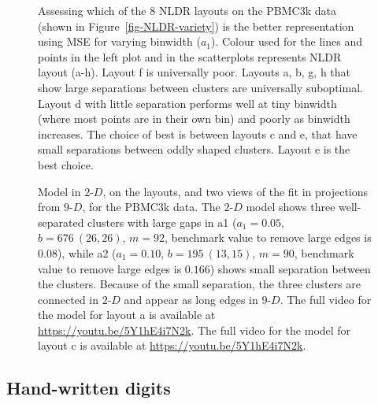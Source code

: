 \documentclass[
  12pt]{article}
\newcommand\gD{$2\text{-}D$}
\begin{document}
\begin{figure}[H]


\caption{\label{fig-pbmc-mse}Assessing which of the 8 NLDR layouts on
the PBMC3k data (shown in Figure~\ref{fig-NLDR-variety}) is the better
representation using MSE for varying binwidth (\(a_1\)). Colour used for
the lines and points in the left plot and in the scatterplots represents
NLDR layout (a-h). Layout f is universally poor. Layouts a, b, g, h that
show large separations between clusters are universally suboptimal.
Layout d with little separation performs well at tiny binwidth (where
most points are in their own bin) and poorly as binwidth increases. The
choice of best is between layouts c and e, that have small separations
between oddly shaped clusters. Layout e is the best choice.}

\end{figure}%

\begin{figure}[H]


\caption{\label{fig-model-pbmc-author-proj}Model in \gD{}, on the
layouts, and two views of the fit in projections from \(9\text{-}D\),
for the PBMC3k data. The \gD{} model shows three well-separated clusters
with large gaps in a1 (\(a_1 = 0.05\), \(b = 676 \  (26,  26)\),
\(m = 92\), benchmark value to remove large edges is \(0.08\)), while a2
(\(a_1 = 0.10\), \(b = 195 \  (13,  15)\), \(m = 90\), benchmark value
to remove large edges is \(0.166\)) shows small separation between the
clusters. Because of the small separation, the three clusters are
connected in \gD{} and appear as long edges in \(9\text{-}D\). The full
video for the model for layout a is available at
\url{https://youtu.be/5Y1hE4i7N2k}. The full video for the model for
layout c is available at \url{https://youtu.be/5Y1hE4i7N2k}.}

\end{figure}%

\subsection{Hand-written digits}\label{hand-written-digits}
\end{document}
